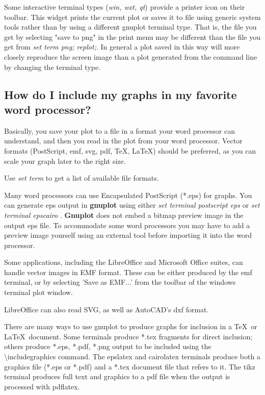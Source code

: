 \documentclass[letter,11pt]{article}
\newcommand{\gnuplot}{\textbf{gnuplot }}
\newcommand{\Gnuplot}{\textbf{Gnuplot }}
\begin{document}
{Some interactive terminal types ({\em win, wxt, qt}) provide a printer icon
on their toolbar. This widget prints the current plot or saves it to file
using generic system tools rather than by using a different gnuplot terminal type.
That is, the file you get by selecting "save to png" in the print menu may be
different than the file you get from {\em set term png; replot;}.
In general a plot saved in this way will more closely reproduce the screen image than
a plot generated from the command line by changing the terminal type.


\subsection{How do I include my graphs in my favorite word processor?}

Basically, you save your plot to a file in a format your word processor
can understand, and then you read in the plot from your word processor. Vector
formats (PostScript, emf, svg, pdf, \TeX{}, \LaTeX{}) should be preferred,
as you can scale your graph later to the right size.

Use {\em set term} to get a list of available file formats.

Many word processors can use Encapsulated PostScript (*.eps) for graphs.
You can generate eps output in \gnuplot using either
{\em set terminal postscript eps}
or
{\em set terminal epscairo}
.
\Gnuplot does not embed a bitmap preview image in the output eps file.
To accommodate some word processors you may have to add a preview image yourself
using an external tool before importing it into the word processor.

Some applications, including the LibreOffice and Microsoft Office suites,
can handle vector images in EMF format. These can be either produced by the emf
terminal, or by selecting 'Save as EMF...' from the toolbar of the
windows terminal plot window.

LibreOffice can also read SVG, as well as AutoCAD's dxf format.

There are many ways to use gnuplot to produce graphs for inclusion in a
\TeX\ or \LaTeX\ document.
Some terminals produce *.tex fragments for direct inclusion; others
produce *.eps, *.pdf, *.png output to be included using the
\textbackslash{}includegraphics command.
The epslatex and cairolatex terminals produce both a graphics
file (*.eps or *.pdf) and a *.tex document file that refers to it.
The tikz terminal produces full text and graphics to a pdf file
when the output is processed with pdflatex.

}
\end{document}
